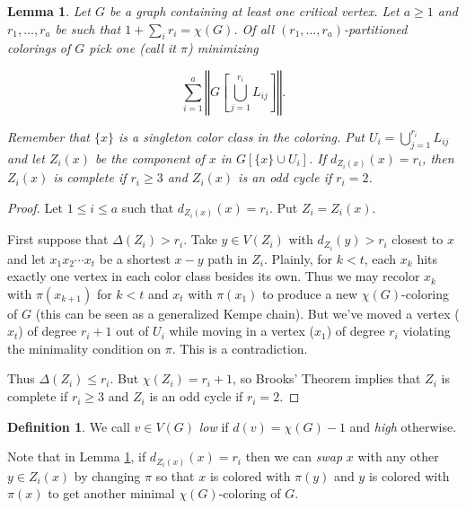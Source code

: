 \documentclass[12pt]{amsart}
\theoremstyle{plain}
\newtheorem{lem}[thm]{Lemma}
\theoremstyle{definition}
\newtheorem{defn}{Definition}
\theoremstyle{remark}
\newcommand{\size}[1]{\left\Vert#1\right\Vert}
\begin{document}
\begin{lem}\label{mozlemma}
Let $G$ be a graph containing at least one critical vertex.   Let $a \geq 1$ and $r_1, \ldots, r_a$ be such that $1 + \sum_i r_i = \chi(G)$. Of all $(r_1, \ldots, r_a)$-partitioned colorings of $G$ pick one (call it $\pi$) minimizing

\[\sum_{i = 1}^a \size{G\left[\bigcup_{j = 1}^{r_i} L_{ij}\right]}.\]

\noindent Remember that $\{x\}$ is a singleton color class in the coloring. Put $U_i = \bigcup_{j = 1}^{r_i} L_{ij}$ and let $Z_i(x)$ be the component of $x$ in $G[\{x\} \cup U_i]$.  If $d_{Z_i(x)}(x) = r_i$, then $Z_i(x)$ is complete if $r_i \geq 3$ and $Z_i(x)$ is an odd cycle if $r_i = 2$.
\end{lem}
\begin{proof}
Let $1 \leq i \leq a$ such that $d_{Z_i(x)}(x) = r_i$. Put $Z_i = Z_i(x)$.

First suppose that $\Delta(Z_i) > r_i$.  Take $y \in V(Z_i)$ with $d_{Z_i}(y) > r_i$ closest to $x$ and let $x_1x_2\cdots x_t$ be a shortest $x-y$ path in $Z_i$.  Plainly, for $k < t$, each $x_k$ hits exactly one vertex in each color class besides its own.  Thus we may recolor $x_k$ with $\pi(x_{k + 1})$ for $k < t$ and $x_t$ with $\pi(x_1)$ to produce a new $\chi(G)$-coloring of $G$ (this can be seen as a generalized Kempe chain).  But we've moved a vertex ($x_t$) of degree $r_i + 1$ out of $U_i$ while moving in a vertex ($x_1$) of degree $r_i$ violating the minimality condition on $\pi$.  This is a contradiction.

Thus $\Delta(Z_i) \leq r_i$.  But $\chi(Z_i) = r_i + 1$, so Brooks' Theorem implies that $Z_i$ is complete if $r_i \geq 3$ and $Z_i$ is an odd cycle if $r_i = 2$.
\end{proof}

\begin{defn}
We call $v \in V(G)$ \emph{low} if $d(v) = \chi(G) - 1$ and \emph{high} otherwise.
\end{defn}

Note that in Lemma \ref{mozlemma}, if $d_{Z_i(x)}(x) = r_i$ then we can \emph{swap} $x$ with any other $y \in Z_i(x)$ by changing $\pi$ so that $x$ is colored with $\pi(y)$ and $y$ is colored with $\pi(x)$ to get another minimal $\chi(G)$-coloring of $G$. 
\end{document}

